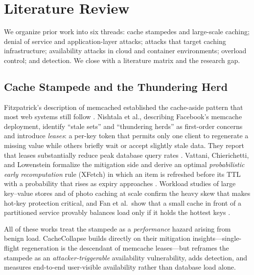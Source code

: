 \section{Literature Review}
\label{sec:related}

We organize prior work into six threads: cache stampedes and large-scale caching;
denial of service and application-layer attacks; attacks that target caching
infrastructure; availability attacks in cloud and container environments; overload
control; and detection. We close with a literature matrix and the research gap.

\subsection{Cache Stampede and the Thundering Herd}
Fitzpatrick's description of memcached established the cache-aside pattern that most
web systems still follow \cite{fitzpatrick2004}. Nishtala et al., describing
Facebook's memcache deployment, identify ``stale sets'' and ``thundering herds'' as
first-order concerns and introduce \emph{leases}: a per-key token that permits only
one client to regenerate a missing value while others briefly wait or accept slightly
stale data. They report that leases substantially reduce peak database query rates
\cite{nishtala2013}. Vattani, Chierichetti, and Lowenstein formalize the mitigation
side and derive an optimal \emph{probabilistic early recomputation} rule (XFetch) in
which an item is refreshed before its TTL with a probability that rises as expiry
approaches \cite{vattani2015}. Workload studies of large key--value stores
\cite{atikoglu2012} and of photo caching at scale \cite{huang2013} confirm the
heavy skew that makes hot-key protection critical, and Fan et al.\ show that a small
cache in front of a partitioned service provably balances load only if it holds the
hottest keys \cite{fan2011}.

All of these works treat the stampede as a \emph{performance} hazard arising from
benign load. CacheCollapse builds directly on their mitigation insights---single-flight
regeneration is the descendant of memcache leases---but reframes the stampede as an
\emph{attacker-triggerable} availability vulnerability, adds detection, and measures
end-to-end user-visible availability rather than database load alone.


